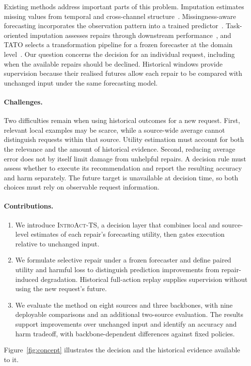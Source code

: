 \documentclass{article}
\newcommand{\introact}{\textsc{IntroAct-TS}}
\begin{document}
Existing methods address important parts of this problem. Imputation estimates missing
values from temporal and cross-channel structure~\citep{cao2018brits,tashiro2021csdi,du2023saits}.
Missingness-aware forecasting incorporates the observation pattern into a trained
predictor~\citep{chen2024bitgraph,peng2025s4m}. Task-oriented imputation assesses repairs
through downstream performance~\citep{wang2024taskoriented,hao2025toivsf,xu2026srdi}, and
TATO selects a transformation pipeline for a frozen forecaster at the domain
level~\citep{qiu2026tato}. Our question concerns the decision for an individual request,
including when the available repairs should be declined. Historical windows provide
supervision because their realised futures allow each repair to be compared with unchanged
input under the same forecasting model.

\paragraph{Challenges.}
Two difficulties remain when using historical outcomes for a new request. First, relevant
local examples may be scarce, while a source-wide average cannot distinguish requests within
that source. Utility estimation must account for both the relevance and the amount of
historical evidence. Second, reducing average error does not by itself limit damage from
unhelpful repairs. A decision rule must assess whether to execute its recommendation and
report the resulting accuracy and harm separately. The future target is unavailable at
decision time, so both choices must rely on observable request information.

\paragraph{Contributions.}
\begin{enumerate}
\setlength{\itemsep}{1pt}\setlength{\parskip}{0pt}
\item We introduce \introact{}, a decision layer that combines local and source-level
estimates of each repair's forecasting utility, then gates execution relative to unchanged input.
\item We formulate selective repair under a frozen forecaster and define paired utility
and harmful loss to distinguish prediction improvements from repair-induced degradation.
Historical full-action replay supplies supervision without using the new request's future.
\item We evaluate the method on eight sources and three backbones, with nine deployable
comparisons and an additional two-source evaluation. The results support improvements over
unchanged input and identify an accuracy and harm tradeoff, with backbone-dependent differences
against fixed policies.
\end{enumerate}
Figure~\ref{fig:concept} illustrates the decision and the historical evidence available to it.
\end{document}
